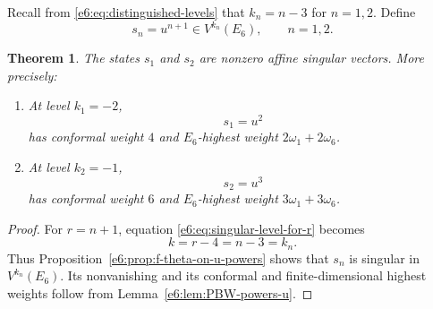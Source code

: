 \documentclass[11pt,reqno]{amsart}
\newtheorem{theorem}{Theorem}[section]
\theoremstyle{definition}
\theoremstyle{remark}
\begin{document}
Recall from \eqref{e6:eq:distinguished-levels} that $k_n=n-3$ for $n=1,2$.
Define
\begin{equation*}
  s_n=u^{n+1}\in V^{k_n}(E_6),
  \qquad n=1,2.
\end{equation*}

\begin{theorem}
The states $s_1$ and $s_2$ are nonzero affine singular vectors.  More precisely:
\begin{enumerate}
  \item At level $k_1=-2$,
  \[
    s_1=u^2
  \]
  has conformal weight $4$ and $E_6$-highest weight
  $2\omega_1+2\omega_6$.

  \item At level $k_2=-1$,
  \[
    s_2=u^3
  \]
  has conformal weight $6$ and $E_6$-highest weight
  $3\omega_1+3\omega_6$.
\end{enumerate}
\end{theorem}

\begin{proof}
For $r=n+1$, equation \eqref{e6:eq:singular-level-for-r} becomes
\[
  k=r-4=n-3=k_n.
\]
Thus Proposition~\ref{e6:prop:f-theta-on-u-powers} shows that $s_n$ is singular in
$V^{k_n}(E_6)$.  Its nonvanishing and its conformal and finite-dimensional
highest weights follow from Lemma~\ref{e6:lem:PBW-powers-u}.
\end{proof}
\end{document}
